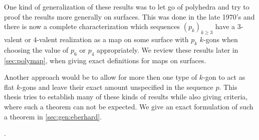 One kind of generalization of these results was to let go of polyhedra and try to proof the results more generally on surfaces. This was done in the late 1970's  and there is now a complete characterization which sequences $(p_k)_{k\geq 3}$ have a $3$-valent or $4$-valent realization as a map on some surface with $p_k$ $k$-gons when choosing the value of $p_6$ or $p_4$ appropriately. We review these results later in \autoref{sec:polymap}, when giving exact definitions for maps on surfaces.

Another approach would be to allow for more then one type of $k$-gon to act as flat $k$-gons and leave their exact amount unspecified in the sequence $p$. This thesis tries to establish many of these kinds of results while also giving criteria, where such a theorem can not be expected. We give an exact formulation of such a theorem in \autoref{sec:gen:eberhard}.


.